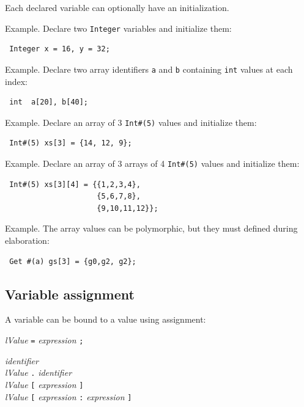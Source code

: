 \documentclass[twoside,letterpaper]{article}
\newcommand{\hm}{\hspace*{1em}}
\newcommand{\te}[1]{\texttt{#1}}
\newcommand{\nterm}[1]{\emph{#1}}
\newcommand{\term}[1]{\texttt{#1}}
\newcommand{\alt}{{$\mid$}}
\newcommand{\gram}[2]{    \hm\makebox[10em][l]{\it #1}\makebox[1.5em][l]{::=}    #2}
\newcommand{\gramalt}[1]{ \hm\makebox[10em][l]{      }\makebox[1.5em][l]{\alt}   #1}
\begin{document}
Each declared variable can optionally have an initialization.

Example.  Declare two \texttt{Integer} variables and initialize them:
\begin{verbatim}
 Integer x = 16, y = 32;
\end{verbatim}

Example.  Declare two array identifiers \texttt{a} and \texttt{b} containing
\texttt{int} values at each index:
\begin{verbatim}
 int  a[20], b[40];
\end{verbatim}

Example.  Declare an array of 3 \te{Int\#(5)} values and initialize
them:
\begin{verbatim}
 Int#(5) xs[3] = {14, 12, 9};
\end{verbatim}

Example.  Declare an array of 3 arrays of 4 \te{Int\#(5)} values and
initialize them:
\begin{verbatim}
 Int#(5) xs[3][4] = {{1,2,3,4},
                     {5,6,7,8},
                     {9,10,11,12}};
\end{verbatim}

Example. The array values can be polymorphic, but they must defined during elaboration:
\begin{verbatim}
 Get #(a) gs[3] = {g0,g2, g2};
\end{verbatim}

\subsection{Variable assignment}

\label{sec-var-assignment}

A variable can be bound to a value using assignment:

\gram{varAssign}{ \nterm{lValue} \term{=} \nterm{expression} \term{;} }

\gram{lValue}{ \nterm{identifier} } \\
\gramalt     { \nterm{lValue} \term{.} \nterm{identifier} } \\
\gramalt     { \nterm{lValue} \term{[} \nterm{expression} \term{]} } \\
\gramalt     { \nterm{lValue} \term{[} \nterm{expression} \term{:}
                                       \nterm{expression} \term{]} }
\end{document}
